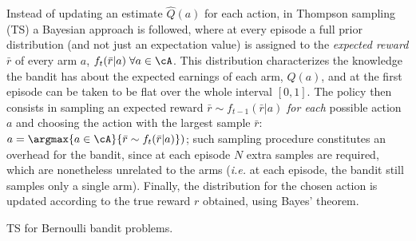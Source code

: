 Instead of updating an estimate $\hat{Q}(a)$ for each action, in Thompson sampling (TS) a Bayesian approach is followed, where at every episode a full prior distribution (and not just an expectation value) is assigned to the \emph{expected reward} $\bar{r}$ of every arm $a$, $f_{t}(\bar{r}|a) \; \forall a \in \cA$. This distribution characterizes the knowledge the bandit has about the expected earnings of each arm, $Q(a)$, and at the first episode can be taken to be flat over the whole interval $[0,1]$. The policy then consists in sampling an expected reward $\bar{r}\sim f_{t-1}(\bar{r}|a)$
\emph{for each} possible action $a$ and choosing the action with the largest sample $\bar{r}$:
$a=\argmax{a\in\cA}\{\bar{r}\sim f_{t}(\bar{r}|a)\})$; such sampling procedure constitutes an overhead for the bandit, since at each episode $N$ extra samples are required, which are nonetheless unrelated to the arms (\textit{i.e.} at each episode, the bandit still samples only a single arm). Finally, the distribution for the chosen action is updated according to the true reward $r$ obtained, using Bayes' theorem.

\begin{algorithm}[b!]\label{alg:tsber}
  \DontPrintSemicolon
  \SetAlgoNoEnd
\;
\caption{TS for Bernoulli bandit problems.}
\end{algorithm}

